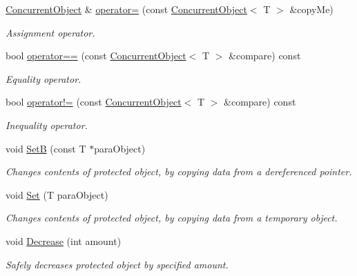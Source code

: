 \begin{DoxyCompactItemize}
\hyperlink{class_concurrent_object}{ConcurrentObject} \& \hyperlink{class_concurrent_object_a89bc9c97db273c54c642ac2f48249619}{operator=} (const \hyperlink{class_concurrent_object}{ConcurrentObject}$<$ T $>$ \&copyMe)
\begin{DoxyCompactList}\small\item\em Assignment operator. \item\end{DoxyCompactList}\item 
bool \hyperlink{class_concurrent_object_a503b0dbf490847945d6c60e0f63f357e}{operator==} (const \hyperlink{class_concurrent_object}{ConcurrentObject}$<$ T $>$ \&compare) const 
\begin{DoxyCompactList}\small\item\em Equality operator. \item\end{DoxyCompactList}\item 
bool \hyperlink{class_concurrent_object_a2a93ee241db643be0a10a63754dc22de}{operator!=} (const \hyperlink{class_concurrent_object}{ConcurrentObject}$<$ T $>$ \&compare) const 
\begin{DoxyCompactList}\small\item\em Inequality operator. \item\end{DoxyCompactList}\item 
void \hyperlink{class_concurrent_object_ae968d8f2bb78e19102ca57138416a91f}{SetB} (const T $\ast$paraObject)
\begin{DoxyCompactList}\small\item\em Changes contents of protected object, by copying data from a dereferenced pointer. \item\end{DoxyCompactList}\item 
void \hyperlink{class_concurrent_object_afa3d2932ed3b805db27ac22eee4a955d}{Set} (T paraObject)
\begin{DoxyCompactList}\small\item\em Changes contents of protected object, by copying data from a temporary object. \item\end{DoxyCompactList}\item 
void \hyperlink{class_concurrent_object_a08c2689b30ec91e48396101a64fcca4d}{Decrease} (int amount)
\begin{DoxyCompactList}\small\item\em Safely decreases protected object by specified amount. \item\end{DoxyCompactList}\item 

\end{DoxyCompactItemize}
